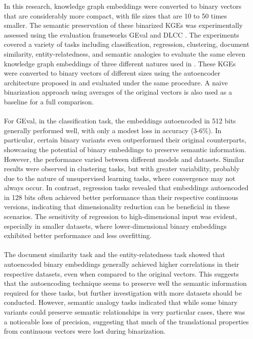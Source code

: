 \documentclass[11pt,titlepage,oneside,openany]{book}
\begin{document}
In this research, knowledge graph embeddings were converted to binary vectors that are considerably more compact, with file sizes that are 10 to 50 times smaller. The semantic preservation of these binarized KGEs was experimentally assessed using the evaluation frameworks GEval \cite{pellegrino_geval_2020} and DLCC \cite{portisch_dlcc_2022}. The experiments covered a variety of tasks including classification, regression, clustering, document similarity, entity-relatedness, and semantic analogies to evaluate the same eleven knowledge graph embeddings of three different natures used in \cite{portisch_rdf2vec_2023}. These KGEs were converted to binary vectors of different sizes using the autoencoder architecture proposed in \cite{tissier_near-lossless_2019} and evaluated under the same procedure. A naive binarization approach using averages of the original vectors is also used as a baseline for a full comparison.\\
\\
For GEval, in the classification task, the embeddings autoencoded in 512 bits generally performed well, with only a modest loss in accuracy (3-6\%). In particular, certain binary variants even outperformed their original counterparts, showcasing the potential of binary embeddings to preserve semantic information. However, the performance varied between different models and datasets. Similar results were observed in clustering tasks, but with greater variability, probably due to the nature of unsupervised learning tasks, where convergence may not always occur. In contrast, regression tasks revealed that embeddings autoencoded in 128 bits often achieved better performance than their respective continuous versions, indicating that dimensionality reduction can be beneficial in these scenarios. The sensitivity of regression to high-dimensional input was evident, especially in smaller datasets, where lower-dimensional binary embeddings exhibited better performance and less overfitting.\\
\\
The document similarity task and the entity-relatedness task showed that autoencoded binary embeddings generally achieved higher correlations in their respective datasets, even when compared to the original vectors. This suggests that the autoencoding technique seems to preserve well the semantic information required for these tasks, but further investigation with more datasets should be conducted. However, semantic analogy tasks indicated that while some binary variants could preserve semantic relationships in very particular cases, there was a noticeable loss of precision, suggesting that much of the translational properties from continuous vectors were lost during binarization.\\
\end{document}
